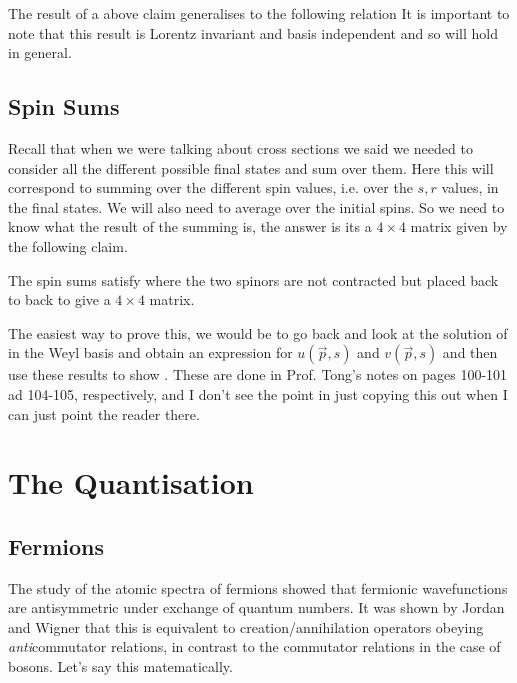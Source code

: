The result of a above claim generalises to the following relation
\noindent It is important to note that this result is Lorentz invariant and basis independent and so will hold in general.

\subsection{Spin Sums}

Recall that when we were talking about cross sections we said we needed to consider all the different possible final states and sum over them. Here this will correspond to summing over the different spin values, i.e. over the $s,r$ values, in the final states. We will also need to average over the initial spins. So we need to know what the result of the summing is, the answer is its a $4\times 4$ matrix given by the following claim. 

\bcl
    The spin sums satisfy
    \noindent where the two spinors are not contracted but placed back to back to give a $4\times 4$ matrix.
\ecl 

\bq 
    The easiest way to prove this, we would be to go back and look at the solution of  in the Weyl basis and obtain an expression for $u(\vec{p},s)$ and $v(\vec{p},s)$ and then use these results to show . These are done in Prof. Tong's notes on pages 100-101 ad 104-105, respectively, and I don't see the point in just copying this out when I can just point the reader there.
\eq 

\section{The Quantisation}

\subsection{Fermions}

The study of the atomic spectra of fermions showed that fermionic wavefunctions are antisymmetric under exchange of quantum numbers. It was shown by Jordan and Wigner that this is equivalent to creation/annihilation operators obeying \textit{anti}commutator relations, in contrast to the commutator relations in the case of bosons. Let's say this matematically.


